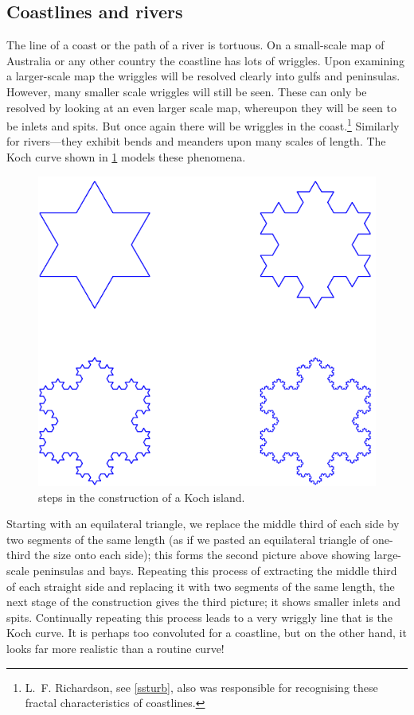 \documentclass[11pt,a4paper]{article}
\begin{document}
\subsection{Coastlines and rivers}
\label{sscoast}

The line of a coast or the path of a river is tortuous.  On a 
small-scale map of Australia or any other country the coastline has 
lots of wriggles.  Upon examining a larger-scale map the wriggles will 
be resolved clearly into gulfs and peninsulas.  However, many smaller 
scale wriggles will still be seen.  These can only be resolved by 
looking at an even larger scale map, whereupon they will be seen to be 
inlets and spits.  But once again there will be wriggles in the 
coast.\footnote{L.~F. Richardson, see \cref{ssturb}, also was 
responsible for recognising these fractal characteristics of 
coastlines.} Similarly for rivers---they exhibit bends and meanders 
upon many scales of length.  The Koch curve shown in 
\cref{F:koch} models these phenomena.
\begin{figure}
	\centering
    \includegraphics[scale=0.9]{koch}
	\caption{steps in the construction of a Koch island.}
	\label{F:koch}
\end{figure}

Starting with an equilateral triangle, we replace the middle third of 
each side by two segments of the same length (as if we pasted an 
equilateral triangle of one-third the size onto each side); this 
forms the second picture above showing large-scale peninsulas and 
bays.  Repeating this process of extracting the middle third of each 
straight side and replacing it with two segments of the same length, 
the next stage of the construction gives the third picture; it shows 
smaller inlets and spits.  Continually repeating this process leads 
to a very wriggly line that is the Koch curve.  It is perhaps too 
convoluted for a coastline, but on the other hand, it looks far more 
realistic than a routine curve!
\end{document}
